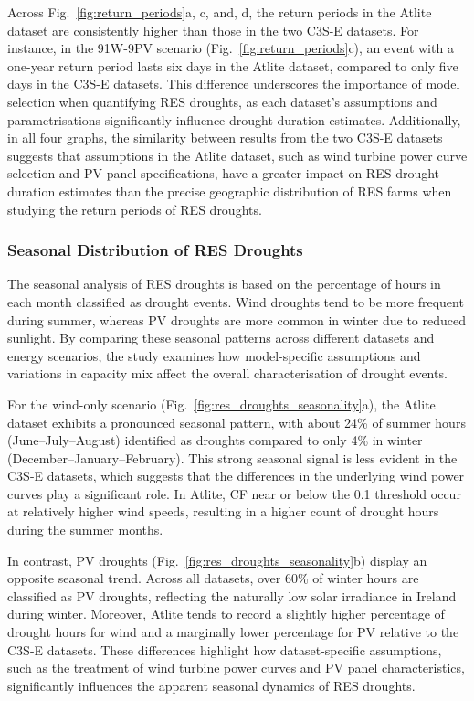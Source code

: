 \documentclass[preprint, 12pt]{elsarticle}
\begin{document}
Across Fig.~\ref{fig:return_periods}a, c, and, d, the return periods in the Atlite dataset are consistently higher than those in the two C3S-E datasets. For instance, in the 91W-9PV scenario (Fig.~\ref{fig:return_periods}c), an event with a one-year return period lasts six days in the Atlite dataset, compared to only five days in the C3S-E datasets. This difference underscores the importance of model selection when quantifying RES droughts, as each dataset’s assumptions and parametrisations significantly influence drought duration estimates. Additionally, in all four graphs, the similarity between results from the two C3S-E datasets suggests that assumptions in the Atlite dataset, such as wind turbine power curve selection and PV panel specifications, have a greater impact on RES drought duration estimates than the precise geographic distribution of RES farms when studying the return periods of RES droughts.

\subsubsection{Seasonal Distribution of RES Droughts}

The seasonal analysis of RES droughts is based on the percentage of hours in each month classified as drought events. Wind droughts tend to be more frequent during summer, whereas PV droughts are more common in winter due to reduced sunlight. By comparing these seasonal patterns across different datasets and energy scenarios, the study examines how model-specific assumptions and variations in capacity mix affect the overall characterisation of drought events.

For the wind-only scenario (Fig.~\ref{fig:res_droughts_seasonality}a), the Atlite dataset exhibits a pronounced seasonal pattern, with about 24\% of summer hours (June–July–August) identified as droughts compared to only 4\% in winter (December–January–February). This strong seasonal signal is less evident in the C3S-E datasets, which suggests that the differences in the underlying wind power curves play a significant role. In Atlite, CF near or below the 0.1 threshold occur at relatively higher wind speeds, resulting in a higher count of drought hours during the summer months.

In contrast, PV droughts (Fig.~\ref{fig:res_droughts_seasonality}b) display an opposite seasonal trend. Across all datasets, over 60\% of winter hours are classified as PV droughts, reflecting the naturally low solar irradiance in Ireland during winter. Moreover, Atlite tends to record a slightly higher percentage of drought hours for wind and a marginally lower percentage for PV relative to the C3S-E datasets. These differences highlight how dataset-specific assumptions, such as the treatment of wind turbine power curves and PV panel characteristics, significantly influences the apparent seasonal dynamics of RES droughts.
\end{document}
